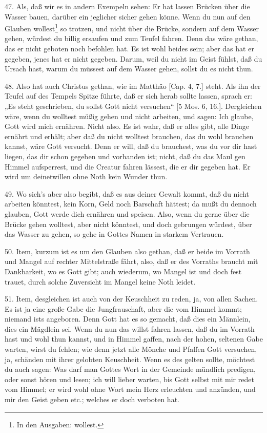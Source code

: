 47. Als, daß wir es in andern Exempeln sehen: Er hat lassen Brücken über die Wasser bauen, darüber ein jeglicher sicher gehen könne. Wenn du nun auf den Glauben wollest\footnote{In den Ausgaben: wollest.} so trotzen, und nicht über die Brücke, sondern auf dem Wasser gehen, würdest du billig ersaufen und zum Teufel fahren. Denn das wäre gethan, das er nicht geboten noch befohlen hat. Es ist wohl beides sein; aber das hat er gegeben, jenes hat er nicht gegeben. Darum, weil du nicht im Geist fühlst, daß du Ursach hast, warum du müssest auf dem Wasser gehen, sollst du es nicht thun.

48. Also hat auch Christus gethan, wie im Matthäo [Cap. 4, 7.] steht. Als ihn der Teufel auf des Tempels Spitze führte, daß er sich herab sollte lassen, sprach er: „Es steht geschrieben, du sollst Gott nicht versuchen“ [5 Mos. 6, 16.]. Dergleichen wäre, wenn du wolltest müßig gehen und nicht arbeiten, und sagen: Ich glaube, Gott wird mich ernähren. Nicht also. Es ist wahr, daß er alles gibt, alle Dinge ernährt und erhält; aber daß du nicht wolltest brauchen, das du wohl brauchen kannst, wäre Gott versucht. Denn er will, daß du brauchest, was du vor dir hast liegen, das dir schon gegeben und vorhanden ist; nicht, daß du das Maul gen Himmel aufsperrest, und die Creatur fahren lässest, die er dir gegeben hat. Er wird um deinetwillen ohne Noth kein Wunder thun.

49. Wo sich’s aber also begibt, daß es aus deiner Gewalt kommt, daß du nicht arbeiten könntest, kein Korn, Geld noch Barschaft hättest; da mußt du dennoch glauben, Gott werde dich ernähren und speisen. Also, wenn du gerne über die Brücke gehen wolltest, aber nicht könntest, und doch gebrungen würdest, über das Wasser zu gehen, so gehe in Gottes Namen in starkem Vertrauen.

50. Item, kurzum ist es um den Glauben also gethan, daß er beide im Vorrath und Mangel auf rechter Mittelstraße fährt, also, daß er des Vorraths braucht mit Dankbarkeit, wo es Gott gibt; auch wiederum, wo Mangel ist und doch fest trauet, durch solche Zuversicht im Mangel keine Noth leidet.

51. Item, desgleichen ist auch von der Keuschheit zu reden, ja, von allen Sachen. Es ist ja eine große Gabe die Jungfrauschaft, aber die vom Himmel kommt; niemand ists angeboren. Denn Gott hat es so gemacht, daß dies ein Männlein, dies ein Mägdlein sei. Wenn du nun das willst fahren lassen, daß du im Vorrath hast und wohl thun kannst, und in Himmel gaffen, nach der hohen, seltenen Gabe warten, wirst du fehlen; wie denn jetzt alle Mönche und Pfaffen Gott versuchen, ja, schänden mit ihrer gelobten Keuschheit. Wenn es des gelten sollte, möchtest du auch sagen: Was darf man Gottes Wort in der Gemeinde mündlich predigen, oder sonst hören und lesen; ich will lieber warten, bis Gott selbst mit mir redet vom Himmel; er wird wohl ohne Wort mein Herz erleuchten und anzünden, und mir den Geist geben etc.; welches er doch verboten hat.

